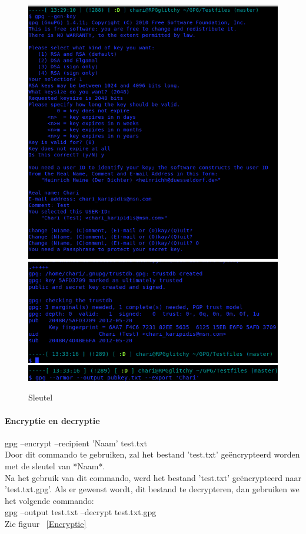 \documentclass[12pt]{article}
\begin{document}
				\begin{figure}
					\begin{center}
						\includegraphics[scale=0.4]{Pictures/Sleutel1}
						\includegraphics[scale=0.4]{Pictures/Sleutel2}
						\includegraphics[scale=0.4]{Pictures/Sleutel3}
					\end{center}
					\caption{Sleutel}\label{Terminal}
				\end{figure}
				
				\paragraph{Encryptie en decryptie} \cite{GPGstart}
				gpg --encrypt --recipient 'Naam' test.txt\\
				Door dit commando te gebruiken, zal het bestand 'test.txt' geëncrypteerd worden
				met de sleutel van *Naam*.\\
				Na het gebruik van dit commando, werd het bestand 'test.txt' geëncrypteerd naar
				'test.txt.gpg'.
				Als er gewenst wordt, dit bestand te decrypteren, dan gebruiken we het volgende 
				commando:\\
				gpg --output test.txt --decrypt test.txt.gpg\\
				Zie figuur ~\ref{Encryptie}\\
				
\end{document}
